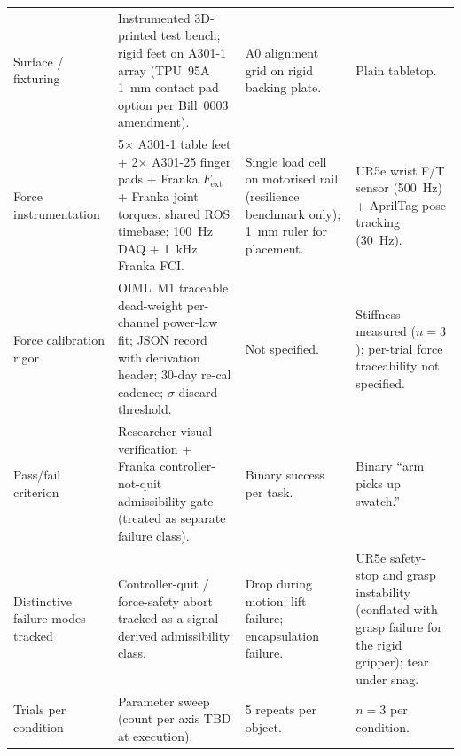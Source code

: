 \documentclass[10pt,letterpaper]{article}
\begin{document}
\begin{table}[!t]
\begin{tabularx}{\textwidth}{@{}L{2.5cm} X X X@{}}
Surface / fixturing
  & Instrumented 3D-printed test bench; rigid feet on A301-1 array (TPU~95A 1~mm contact pad option per Bill~0003 amendment).
  & A0 alignment grid on rigid backing plate.
  & Plain tabletop. \\
Force instrumentation
  & 5$\times$ A301-1 table feet + 2$\times$ A301-25 finger pads + Franka $F_{\text{ext}}$ + Franka joint torques, shared ROS timebase; 100~Hz DAQ + 1~kHz Franka FCI.
  & Single load cell on motorised rail (resilience benchmark only); 1~mm ruler for placement.
  & UR5e wrist F/T sensor (500~Hz) + AprilTag pose tracking (30~Hz). \\
Force calibration rigor
  & OIML~M1 traceable dead-weight per-channel power-law fit; JSON record with derivation header; 30-day re-cal cadence; $\sigma$-discard threshold.
  & Not specified.
  & Stiffness measured ($n{=}3$); per-trial force traceability not specified. \\
Pass/fail criterion
  & Researcher visual verification + Franka controller-not-quit admissibility gate (treated as separate failure class).
  & Binary success per task.
  & Binary ``arm picks up swatch.'' \\
Distinctive failure modes tracked
  & Controller-quit / force-safety abort tracked as a signal-derived admissibility class.
  & Drop during motion; lift failure; encapsulation failure.
  & UR5e safety-stop and grasp instability (conflated with grasp failure for the rigid gripper); tear under snag. \\
Trials per condition
  & Parameter sweep (count per axis TBD at execution).
  & 5 repeats per object.
  & $n{=}3$ per condition. \\
\bottomrule
\end{tabularx}
\end{table}
\end{document}
